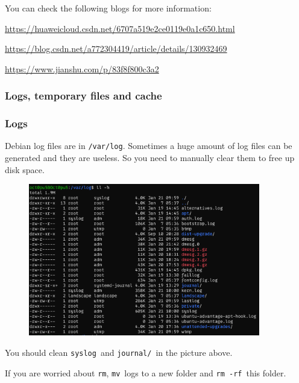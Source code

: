 \documentclass[12pt]{ctexart}
\newenvironment{mdquote}
{%
  \par\noindent
  \begin{list}{}{%
      \setlength{\leftmargin}{1em}%
      \setlength{\rightmargin}{0pt}%
      \setlength{\itemindent}{0pt}%
      \setlength{\listparindent}{\parindent}%
      \setlength{\topsep}{0.5\baselineskip}%
  }
  \item[\textbf{>}\ ]\itshape
}
{\end{list}\par}
\begin{document}
\begin{mdquote}
You can check the following blogs for more information:

\url{https://huaweicloud.csdn.net/6707a519e2ce0119e0a1c650.html}

\url{https://blog.csdn.net/a772304419/article/details/130932469}

\url{https://www.jianshu.com/p/83f8f800c3a2}
\end{mdquote}

\subsubsection{\textbf{Logs, temporary files and cache}}

\subsubsection*{\textbf{Logs}}

Debian log files are in \texttt{/var/log}. Sometimes a huge amount of
log files can be generated and they are useless. So you need to manually
clear them to free up disk space.

\begin{figure}[H]
    \centering
    \includegraphics[width=0.9\textwidth,keepaspectratio]{assets/Linux/2.4 No, the C drive is almost full!/1.png}
\end{figure}

You should clean \texttt{syslog}\ and \texttt{journal/}\ in the picture
above.

\begin{mdquote}
If you are worried about \texttt{rm}, \texttt{mv}\ logs to a new folder
and \texttt{rm\ -rf}\ this folder.
\end{mdquote}
\end{document}
